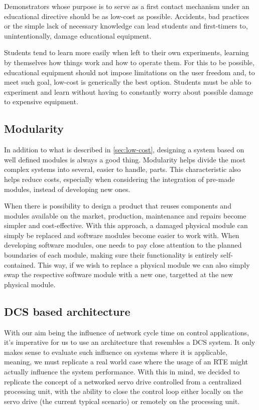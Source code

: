 Demonstrators whose purpose is to serve as a first contact mechanism under an educational directive should be as low-cost as possible.
Accidents, bad practices or the simple lack of necessary knowledge can lead students and first-timers to, unintentionally, damage educational equipment.

Students tend to learn more easily when left to their own experiments, learning by themselves how things work and how to operate them. %
For this to be possible, educational equipment should not impose limitations on the user freedom and, to meet such goal, low-cost is generically the best option.
Students must be able to experiment and learn without having to constantly worry about possible damage to expensive equipment.

\subsection{Modularity}

In addition to what is described in \autoref{sec:low-cost}, designing a system based on well defined modules is always a good thing.
Modularity helps divide the most complex systems into several, easier to handle, parts.
This characteristic also helps reduce costs, especially when considering the integration of pre-made modules, instead of developing new ones.

When there is possibility to design a product that reuses components and modules available on the market, production, maintenance and repairs become simpler and cost-effective.
With this approach, a damaged physical module can simply be replaced and software modules become easier to work with.
When developing software modules, one needs to pay close attention to the planned boundaries of each module, making sure their functionality is entirely self-contained.
This way, if we wish to replace a physical module we can also simply swap the respective software module with a new one, targetted at the new physical module.

\subsection{DCS based architecture}

With our aim being the influence of network cycle time on control applications, it's imperative for us to use an architecture that resembles a DCS system.
It only makes sense to evaluate such influence on systems where it is applicable, meaning, we must replicate a real world case where the usage of an RTE might actually influence the system performance.
With this in mind, we decided to replicate the concept of a networked servo drive controlled from a centralized processing unit, with the ability to close the control loop either locally on the servo drive (the current typical scenario) or remotely on the processing unit.
